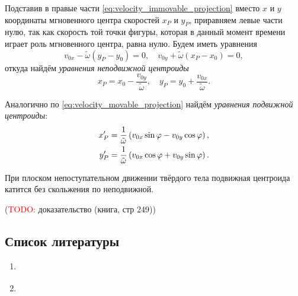 Подставив в правые части \ref{eq:velocity_immovable_projection} вместо $x$ и
$y$ координаты мгновенного центра скоростей $x_P$ и $y_P$, приравняем левые
части нулю, так как скорость той точки фигуры, которая в данный момент времени
играет роль мгновенного центра, равна нулю. Будем иметь уравнения
\begin{equation*}
  v_{0x} - \tilde{\omega} (y_P - y_0) = 0, \quad
  v_{0y} + \tilde{\omega} (x_P - x_0) = 0,
\end{equation*}
откуда найдём \textit{уравнения неподвижной центроиды}
\begin{equation}
  \label{eq:immovable_centroid}
  x_P = x_0 - \frac{v_{0y}}{\tilde{\omega}}, \quad
  y_P = y_0 + \frac{v_{0x}}{\tilde{\omega}}.
\end{equation}

Аналогично по \ref{eq:velocity_movable_projection} найдём \textit{уравнения
подвижной центроиды}:
\begin{equation}
  \label{eq:movable_centroid}
  \begin{aligned}
    x_P' &= \frac{1}{\tilde{\omega}} \left( v_{0x} \sin\varphi - v_{0y}
      \cos\varphi \right), \\
    y_P' &= \frac{1}{\tilde{\omega}} \left( v_{0x} \cos\varphi + v_{0y}
      \sin\varphi \right).
  \end{aligned}
\end{equation}

\begin{theorem}[Пуансо]
  При плоском непоступательном движении твёрдого тела подвижная центроида
  катится без скольжения по неподвижной.
\end{theorem}

(\textcolor{red}{TODO:} доказательство (книга, стр 249))

\subsection{Список литературы}
\begin{enumerate}
  \item \cite{lectures}
  \item \cite{lourie}
\end{enumerate}

